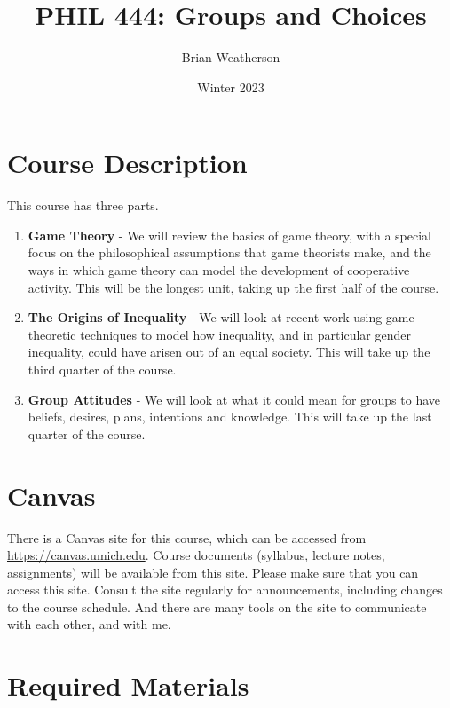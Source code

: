\documentclass[
]{article}
\title{PHIL 444: Groups and Choices}
\author{Brian Weatherson}
\date{Winter 2023}
\providecommand{\tightlist}{%
  \setlength{\itemsep}{0pt}\setlength{\parskip}{0pt}}
\begin{document}
\maketitle

\hypertarget{course-description}{%
\section{Course Description}\label{course-description}}

This course has three parts.

\begin{enumerate}
\def\labelenumi{\arabic{enumi}.}
\tightlist
\item
  \textbf{Game Theory} - We will review the basics of game theory, with
  a special focus on the philosophical assumptions that game theorists
  make, and the ways in which game theory can model the development of
  cooperative activity. This will be the longest unit, taking up the
  first half of the course.
\item
  \textbf{The Origins of Inequality} - We will look at recent work using
  game theoretic techniques to model how inequality, and in particular
  gender inequality, could have arisen out of an equal society. This
  will take up the third quarter of the course.
\item
  \textbf{Group Attitudes} - We will look at what it could mean for
  groups to have beliefs, desires, plans, intentions and knowledge. This
  will take up the last quarter of the course.
\end{enumerate}

\hypertarget{canvas}{%
\section{Canvas}\label{canvas}}

There is a Canvas site for this course, which can be accessed from
\url{https://canvas.umich.edu}. Course documents (syllabus, lecture
notes, assignments) will be available from this site. Please make sure
that you can access this site. Consult the site regularly for
announcements, including changes to the course schedule. And there are
many tools on the site to communicate with each other, and with me.

\hypertarget{required-materials}{%
\section{Required Materials}\label{required-materials}}
\end{document}
